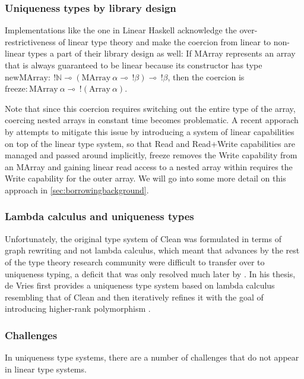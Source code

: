 \subsubsection{Uniqueness types by library design}
Implementations like the one in Linear Haskell \citep{bernardy_linear_2018} acknowledge the over-restrictiveness of linear type theory and make the coercion from linear to non-linear types a part of their library design as well: If MArray represents an array that is always guaranteed to be linear because its constructor has type $\mathrm{newMArray} :\ !\mathbb{N} \multimap (\mathrm{MArray}\ \alpha \multimap\ !\beta) \multimap\ !\beta$, then the coercion is $\mathrm{freeze} : \mathrm{MArray}\ \alpha \multimap\ !(\mathrm{Array}\ \alpha)$. 

Note that since this coercion requires switching out the entire type of the array, coercing nested arrays in constant time becomes problematic. A recent apporach by \cite{spiwack_linearly_2022} attempts to mitigate this issue by introducing a system of linear capabilities on top of the linear type system, so that Read and Read+Write capabilities are managed and passed around implicitly, freeze removes the Write capability from an MArray and gaining linear read access to a nested array within requires the Write capability for the outer array. We will go into some more detail on this approach in \cref{sec:borrowingbackground}.

\subsubsection{Lambda calculus and uniqueness types}
Unfortunately, the original type system of Clean was formulated in terms of graph rewriting and not lambda calculus, which meant that advances by the rest of the type theory research community were difficult to transfer over to uniqueness typing, a deficit that was only resolved much later by \cite{de_vries_making_2009}. In his thesis, de Vries first provides a uniqueness type system based on lambda calculus resembling that of Clean and then iteratively refines it with the goal of introducing higher-rank polymorphism \citep{jones_practical_2007}.

\subsubsection{Challenges}
In uniqueness type systems, there are a number of challenges that do not appear in linear type systems. 

